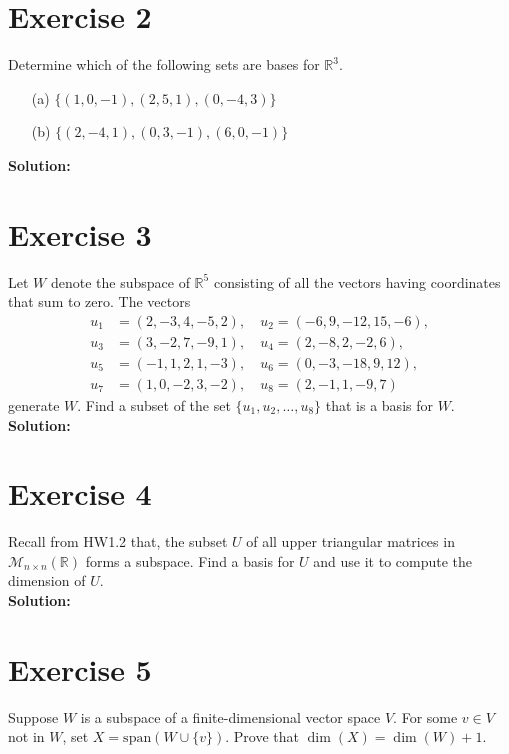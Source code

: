 \documentclass{article}
\begin{document}
\newpage

\section*{Exercise 2}
Determine which of the following sets are bases for $\mathbb{R}^3$.
\begin{itemize}
\item[(a)] $\{(1,0,-1),(2,5,1),(0,-4,3)\}$
\item[(b)] $\{(2,-4,1),(0,3,-1),(6,0,-1)\}$
\end{itemize}

\textbf{Solution:} \\



\newpage

\section*{Exercise 3}
Let $W$ denote the subspace of $\mathbb{R}^5$ consisting of all the vectors having coordinates that sum to zero. The vectors
\begin{align*}
u_1 &= (2,-3,4,-5,2), \quad u_2 = (-6,9,-12,15,-6),\\
u_3 &= (3,-2,7,-9,1), \quad u_4 = (2,-8,2,-2,6),\\
u_5 &= (-1,1,2,1,-3), \quad u_6 = (0,-3,-18,9,12),\\
u_7 &= (1,0,-2,3,-2), \quad u_8 = (2,-1,1,-9,7)
\end{align*}
generate $W$. Find a subset of the set $\{u_1,u_2,\ldots,u_8\}$ that is a basis for $W$. \\

\textbf{Solution:} \\



\newpage

\section*{Exercise 4}
Recall from HW1.2 that, the subset $U$ of all upper triangular matrices in $\mathcal{M}_{n\times n}(\mathbb{R})$ forms a subspace. Find a basis for $U$ and use it to compute the dimension of $U$. \\

\textbf{Solution:} \\



\newpage

\section*{Exercise 5}
Suppose $W$ is a subspace of a finite-dimensional vector space $V$. For some $v \in V$ not in $W$, set $X = \text{span}(W \cup \{v\})$. Prove that $\dim(X) = \dim(W) + 1$. \\
\end{document}
